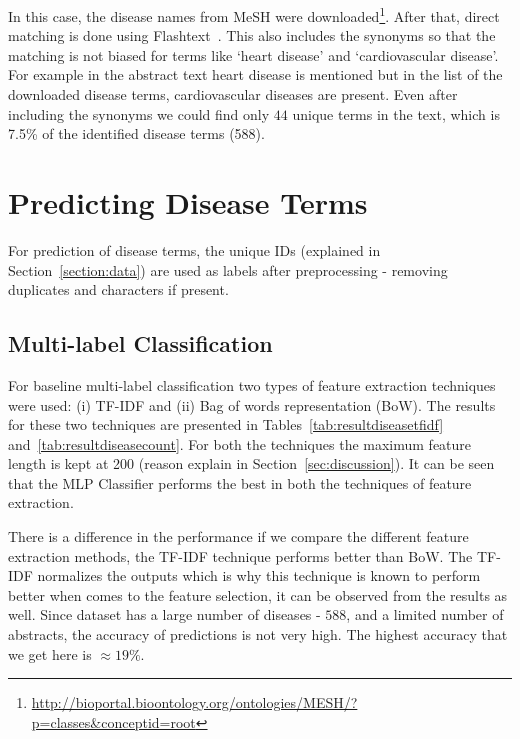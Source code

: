 In this case, the disease names from MeSH were downloaded\footnote{\url{http://bioportal.bioontology.org/ontologies/MESH/?p=classes&conceptid=root}}. After that, direct matching is done using Flashtext~\cite{2017arXiv171100046S}. 
This also includes the synonyms so that the matching is not biased for terms like `heart disease' and `cardiovascular disease'. For example in the abstract text heart disease is mentioned but in the list of the downloaded disease terms, cardiovascular diseases are present.  Even after including the synonyms we could find only $44$ unique terms in the text, which is 7.5\% of the identified disease terms (588).

\section{Predicting Disease Terms}
For prediction of disease terms, the unique IDs (explained in Section~\ref{section:data}) are used as labels after preprocessing - removing duplicates and characters if present. 

\subsection{Multi-label Classification}
For baseline multi-label classification two types of feature extraction techniques were used: (i) TF-IDF and (ii) Bag of words representation (BoW). The results for these two techniques are presented in Tables~\ref{tab:resultdiseasetfidf} and~\ref{tab:resultdiseasecount}. For both the techniques the maximum feature length is kept at 200 (reason explain in Section~\ref{sec:discussion}). It can be seen that the MLP Classifier performs the best in both the techniques of feature extraction. 

There is a difference in the performance if we compare the different feature extraction methods, the TF-IDF technique performs better than BoW. The TF-IDF normalizes the outputs which is why this technique is known to perform better when comes to the feature selection, it can be observed from the results as well. 
Since dataset has a large number of diseases - $588$, and a limited number of abstracts, the accuracy of predictions is not very high. The highest accuracy that we get here is $\approx 19\%$. 

